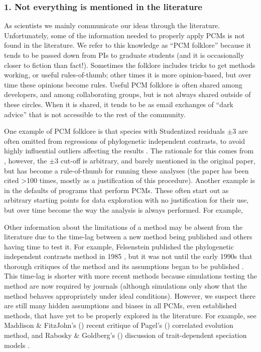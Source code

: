\documentclass[a4paper,12pt]{article}
\begin{document}
  \subsubsection{1. Not everything is mentioned in the literature}
    As scientists we mainly communicate our ideas through the literature. 
    Unfortunately, some of the information needed to properly apply PCMs is not found in the literature. 
    We refer to this knowledge as ``PCM folklore'' because it tends to be passed down from PIs to graduate students (and it is occasionally closer to fiction than fact!).
    Sometimes the folklore includes tricks to get methods working, or useful rules-of-thumb; other times it is more opinion-based, but over time these opinions become rules. 
    Useful PCM folklore is often shared among developers, and among collaborating groups, but is not always shared outside of these circles. 
    When it is shared, it tends to be as email exchanges of ``dark advice'' that is not accessible to the rest of the community.

    One example of PCM folklore is that species with Studentized residuals $\pm 3$ are often omitted from regressions of phylogenetic independent contrasts, to avoid highly influential outliers affecting the results \citep[e.g.][]{GEB:GEB355}. 
    The rationale for this comes from \citet{jones1997optimum}, however, the $\pm 3$ cut-off is arbitrary, and barely mentioned in the original paper, but has become a rule-of-thumb for running these analyses (the paper has been cited \textgreater 100 times, mostly as a justification of this procedure).
    Another example is in the defaults of programs that perform PCMs. 
    These often start out as arbitrary starting points for data exploration with no justification for their use, but over time become the way the analysis is always performed.
    For example, %

    Other information about the limitations of a method may be absent from the literature due to the time-lag between a new method being published and others having time to test it. 
    For example, Felsenstein published the phylogenetic independent contrasts method in 1985 \citep{felsenstein1985phylogenies}, but it was not until the early 1990s that thorough critiques of the method and its assumptions began to be published \citep[e.g.][]{garland1992procedures}.
    This time-lag is shorter with more recent methods because simulations testing the method are now required by journals (although simulations only show that the method behaves appropriately under ideal conditions).
    However, we suspect there are still many hidden assumptions and biases in all PCMs, even established methods, that have yet to be properly explored in the literature.
    For example, see Maddison \& FitzJohn's (\citeyear{maddison2014unsolved}) recent critique of Pagel's (\citeyear{pagel1994detecting}) correlated evolution method, and Rabosky \& Goldberg's (\citeyear{rabosky2015model}) discussion of trait-dependent speciation models \citep{maddison2007estimating,nee1994reconstructed}.
\end{document}

